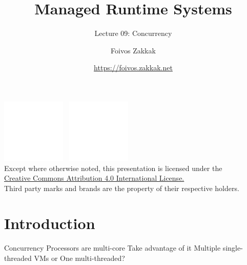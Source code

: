 \documentclass[
14pt,
aspectratio=169,
usenames,
dvipsnames,
x11names]{beamer}
\title{Managed Runtime Systems}
\subtitle{Lecture 09: Concurrency}
\author[\url{https://foivos.zakkak.net}]{Foivos Zakkak}
\date{\url{https://foivos.zakkak.net}}
\begin{document}


\begin{frame}[plain]
  \titlepage
  \centering
  \includegraphics[height=.75cm]{cc}~
  \includegraphics[height=.75cm]{by}\\[1em]
  \scriptsize{Except where otherwise noted, this presentation is licensed under the\\
    \href{http://creativecommons.org/licenses/by/4.0/}%
    {Creative Commons Attribution 4.0 International License.}\\[1ex]
    Third party marks and brands are the property of their respective
    holders.}
\end{frame}


\section{Introduction}

\begin{frame}{Concurrency}
  Processors are multi-core
  \vfill
  Take advantage of it
  \vfill
  Multiple single-threaded VMs or One multi-threaded?
\end{frame}
\end{document}

